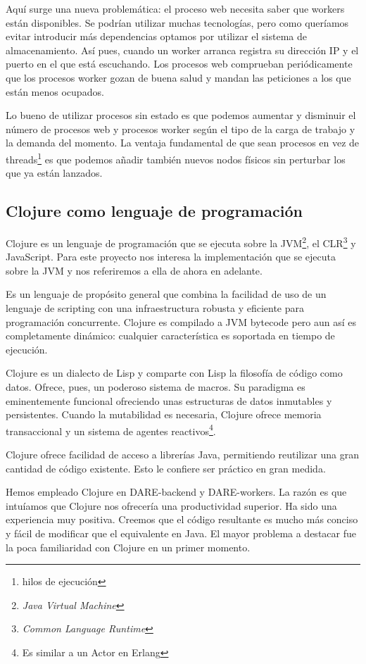 Aquí surge una nueva problemática: el proceso web necesita saber que
workers están disponibles. Se podrían utilizar muchas tecnologías,
pero como queríamos evitar introducir más dependencias optamos por
utilizar el sistema de almacenamiento. Así pues, cuando un worker
arranca registra su dirección IP y el puerto en el que está
escuchando. Los procesos web comprueban periódicamente que los
procesos worker gozan de buena salud y mandan las peticiones a los que
están menos ocupados.

Lo bueno de utilizar procesos sin estado es que podemos aumentar y
disminuir el número de procesos web y procesos worker según el tipo de
la carga de trabajo y la demanda del momento. La ventaja fundamental
de que sean procesos en vez de threads\footnote{hilos de ejecución} es
que podemos añadir también nuevos nodos físicos sin perturbar los que
ya están lanzados.

\subsection{Clojure como lenguaje de programación}

Clojure es un lenguaje de programación que se ejecuta sobre la
JVM\footnote{\emph{Java Virtual Machine}}, el
CLR\cite{CLR}\footnote{\emph{Common Language Runtime}} y
JavaScript. Para este proyecto nos interesa la implementación que se
ejecuta sobre la JVM y nos referiremos a ella de ahora en adelante.

Es un lenguaje de propósito general que combina la facilidad de uso de
un lenguaje de scripting con una infraestructura robusta y eficiente
para programación concurrente. Clojure es compilado a JVM bytecode
pero aun así es completamente dinámico: cualquier característica es
soportada en tiempo de ejecución.

Clojure es un dialecto de Lisp\cite{LISP} y comparte con Lisp la
filosofía de código como datos. Ofrece, pues, un poderoso sistema de
macros. Su paradigma es eminentemente funcional ofreciendo unas
estructuras de datos inmutables y
persistentes\cite{PERSISTENT-DATA-STRUCTURES}. Cuando la mutabilidad
es necesaria, Clojure ofrece memoria transaccional y un sistema de
agentes reactivos\footnote{Es similar a un Actor en Erlang}.

Clojure ofrece facilidad de acceso a librerías Java, permitiendo
reutilizar una gran cantidad de código existente. Esto le confiere ser
práctico en gran medida.

Hemos empleado Clojure en DARE-backend y DARE-workers. La razón es que
intuíamos que Clojure nos ofrecería una productividad superior. Ha
sido una experiencia muy positiva. Creemos que el código resultante es
mucho más conciso y fácil de modificar que el equivalente en Java. El
mayor problema a destacar fue la poca familiaridad con Clojure en un
primer momento.


